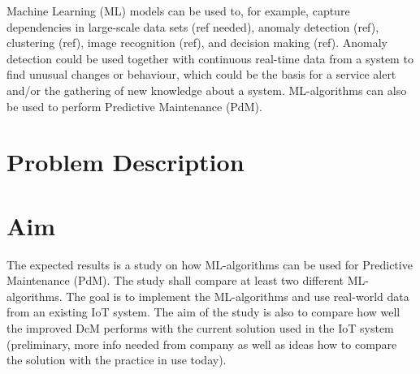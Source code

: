 Machine Learning (ML) models can be used to, for example, capture dependencies in large-scale data sets (ref needed), anomaly detection (ref), clustering (ref), image recognition (ref), and decision making (ref). 
Anomaly detection could be used together with continuous real-time data from a system to find unusual changes or behaviour, which could be the basis for a service alert and/or the gathering of new knowledge about a system.
ML-algorithms can also be used to perform Predictive Maintenance (PdM).

\section{Problem Description}
\label{sec:problem-description}

\section{Aim}
\label{sec:aim}
The expected results is a study on how ML-algorithms can be used for Predictive Maintenance (PdM).
The study shall compare at least two different ML-algorithms.
The goal is to implement the ML-algorithms and use real-world data from an existing IoT system.
The aim of the study is also to compare how well the improved DcM performs with the current solution used in the IoT system (preliminary, more info needed from company as well as ideas how to compare the solution with the practice in use today).

